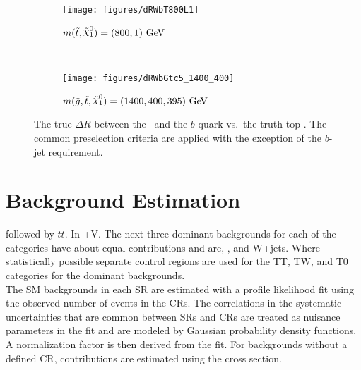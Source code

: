 \begin{figure}[h]
	\centering
	\begin{subfigure}[b]{0.45\textwidth}
		\texttt{[image: figures/dRWbT800L1]}
		\caption{$m(\stop,\ninoone)=(800,1)~\GeV$}
		\label{fig:SRBoost_dRWb_T800L1}
	\end{subfigure}
	~ %
	\begin{subfigure}[b]{0.45\textwidth}
		\texttt{[image: figures/dRWbGtc5\_1400\_400]}
		\caption{$m(\gluino,\stop,\ninoone)=(1400,400,395)~\GeV$}
		\label{fig:SRBoost_dRWb_Gtc_1400_400}
	\end{subfigure}
	\caption[The true $\Delta R$ between the \Wboson\ and the $b$-quark vs. the top \pt]{The true $\Delta R$ between the \Wboson\ and the $b$-quark vs.\ the truth top \pt. The common preselection criteria are applied with the exception of the $b$-jet requirement.}
	\label{fig:SRBoost_dRWb}
\end{figure}


\section{Background Estimation}








 followed by $t\bar{t}$.  In  \ttbar+V. The next three dominant backgrounds for each of the categories have about equal contributions and are, \ttbar, and W+jets. Where statistically possible separate control regions are used for the TT, TW, and T0 categories for the dominant backgrounds. \\ %

The SM backgrounds in each SR are estimated with a profile likelihood fit using the observed number of events in the CRs.  The correlations in the systematic uncertainties that are common between SRs and CRs  are treated as nuisance parameters in the fit and are modeled by Gaussian probability density functions.  A normalization factor is then derived from the fit.  For backgrounds without a defined CR, contributions are estimated using the cross section.  \\


